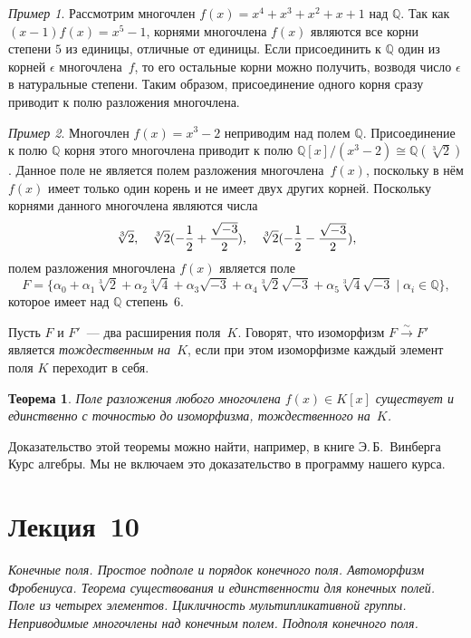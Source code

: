 \documentclass[a4paper,10pt]{amsart}
\def\QQ{{\mathbb Q}}%
\newtheorem{theorem}{Теорема}
\theoremstyle{definition}
\theoremstyle{remark}
\newtheorem{example}{Пример}
\begin{document}
\begin{example}
	Рассмотрим многочлен $f(x) = x^4+x^3+x^2+x+1$ над $\QQ$. Так как
	$(x-1)f(x) = x^5-1$, корнями многочлена $f(x)$ являются все корни
	степени $5$ из единицы, отличные от единицы. Если присоединить к
	$\QQ$ один из корней $\epsilon$ многочлена~$f$, то его остальные
	корни можно получить, возводя число $\epsilon$ в натуральные
	степени. Таким образом, присоединение одного корня сразу приводит к
	полю разложения многочлена.
\end{example}


\begin{example}
	Многочлен $f(x)=x^3-2$ неприводим над полем $\QQ$. Присоединение к
	полю $\QQ$ корня этого многочлена приводит к полю $\QQ[x]/(x^3-2)
	\cong \QQ(\sqrt[3]{2})$. Данное поле не является полем разложения
	многочлена~$f(x)$, поскольку в нём $f(x)$ имеет только один корень и
	не имеет двух других корней. Поскольку корнями данного многочлена
	являются числа
	$$
	\sqrt[3]{2}, \quad \sqrt[3]{2}(-\frac{1}{2} + \cfrac{\sqrt{-3}}{2}),
	\quad \sqrt[3]{2}(-\frac{1}{2} - \frac{\sqrt{-3}}{2}),
	$$
	полем разложения многочлена $f(x)$ является поле
	$$
	F = \{\alpha_0 + \alpha_1 \sqrt[3]{2} + \alpha_2 \sqrt[3]{4} +
	\alpha_3 \sqrt{-3} + \alpha_4 \sqrt[3]{2} \sqrt{-3} + \alpha_5
	\sqrt[3]{4} \sqrt{-3} \mid \alpha_i \in \QQ\},
	$$
	которое имеет над $\QQ$ степень~$6$.
\end{example}

Пусть $F$ и $F'$~--- два расширения поля~$K$. Говорят, что
изоморфизм $F \xrightarrow{\sim} F'$ является \textit{тождественным
	на~$K$}, если при этом изоморфизме каждый элемент поля $K$ переходит
в себя.

\begin{theorem}
	Поле разложения любого многочлена $f(x) \in K[x]$ существует и
	единственно с точностью до изоморфизма, тождественного на~$K$.
\end{theorem}

Доказательство этой теоремы можно найти, например, в книге
Э.\,Б.~Винберга \guillemotleft Курс алгебры\guillemotright{}. Мы не
включаем это доказательство в программу нашего курса.


\newpage

\section*{Лекция~10}

\medskip

{\it Конечные поля. Простое подполе и порядок конечного поля.
	Автоморфизм Фробениуса. Теорема существования и единственности для
	конечных полей. Поле из четырех элементов. Цикличность
	мультипликативной группы. Неприводимые многочлены над конечным
	полем. Подполя конечного поля.}
\end{document}
